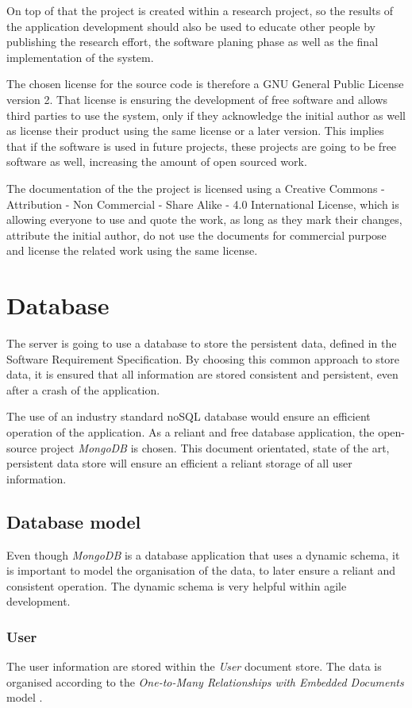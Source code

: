 On top of that the project is created within a research project, so the results of the application development should also be used to educate other people by publishing the research effort, the software planing phase as well as the final implementation of the system.

The chosen license for the source code is therefore a GNU General Public License version 2. That license is ensuring the development of free software and allows third parties to use the system, only if they acknowledge the initial author as well as license their product using the same license or a later version. This implies that if the software is used in future projects, these projects are going to be free software as well, increasing the amount of open sourced work.

The documentation of the the project is licensed using a Creative Commons - Attribution - Non Commercial - Share Alike - 4.0 International License, which is allowing everyone to use and quote the work, as long as they mark their changes, attribute the initial author, do not use the documents for commercial purpose and license the related work using the same license.

\chapter{Database}
The server is going to use a database to store the persistent data, defined in the Software Requirement Specification. By choosing this common approach to store data, it is ensured that all information are stored consistent and persistent, even after a crash of the application.

The use of an industry standard noSQL database would ensure an efficient operation of the application. As a reliant and free database application, the open-source project \emph{MongoDB} is chosen. This document orientated, state of the art, persistent data store will ensure an efficient a reliant storage of all user information.

\section{Database model}
Even though \emph{MongoDB} is a database application that uses a dynamic schema, it is important to model the organisation of the data, to later ensure a reliant and consistent operation. The dynamic schema is very helpful within agile development.

\subsection{User}
The user information are stored within the \emph{User} document store. The data is organised according to the \emph{One-to-Many Relationships with Embedded Documents} model \cite[p. 141]{Mongo:2014aa}.

